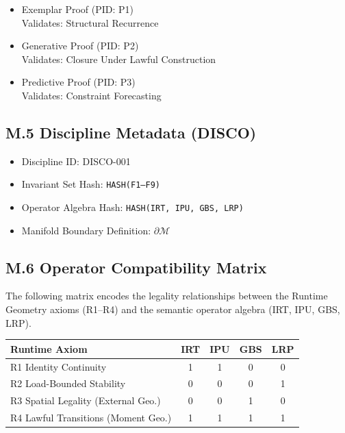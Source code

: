 \begin{itemize}
    \item Exemplar Proof \hfill (PID: P1) \\
    Validates: Structural Recurrence

    \item Generative Proof \hfill (PID: P2) \\
    Validates: Closure Under Lawful Construction

    \item Predictive Proof \hfill (PID: P3) \\
    Validates: Constraint Forecasting
\end{itemize}

\subsection*{M.5 Discipline Metadata (DISCO)}

\begin{itemize}
    \item Discipline ID: DISCO-001
    \item Invariant Set Hash: \texttt{HASH(F1–F9)}
    \item Operator Algebra Hash: \texttt{HASH(IRT, IPU, GBS, LRP)}
    \item Manifold Boundary Definition: $\partial \mathcal{M}$
\end{itemize}

\subsection*{M.6 Operator Compatibility Matrix}

The following matrix encodes the legality relationships between the Runtime
Geometry axioms (R1–R4) and the semantic operator algebra (IRT, IPU, GBS, LRP).

\begin{center}
\begin{tabular}{lcccc}
\toprule
\textbf{Runtime Axiom} & \textbf{IRT} & \textbf{IPU} & \textbf{GBS} & \textbf{LRP} \\
\midrule
R1 Identity Continuity              & 1 & 1 & 0 & 0 \\
R2 Load-Bounded Stability           & 0 & 0 & 0 & 1 \\
R3 Spatial Legality (External Geo.) & 0 & 0 & 1 & 0 \\
R4 Lawful Transitions (Moment Geo.) & 1 & 1 & 1 & 1 \\
\bottomrule
\end{tabular}
\end{center}

